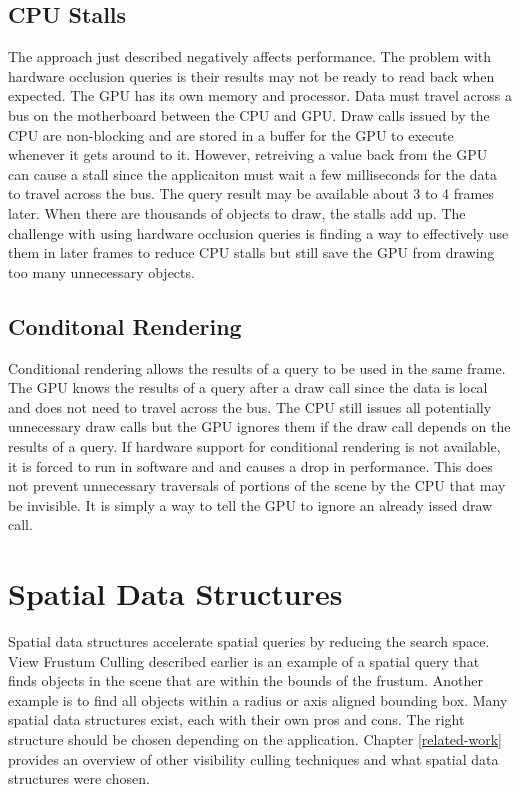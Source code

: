 \documentclass[12pt]{ucthesis}
\begin{document}
\subsection{CPU Stalls}
\label{cpu-stalls}

The approach just described negatively affects performance.
The problem with hardware occlusion queries is their results may not be ready to read back when expected.\cite{GpuGem-Occlusion, GpuGem-Queries, CHC, CHCpp}
The GPU has its own memory and processor.
Data must travel across a bus on the motherboard between the CPU and GPU.
Draw calls issued by the CPU are non-blocking and are stored in a buffer for the GPU to execute whenever it gets around to it.
However, retreiving a value back from the GPU can cause a stall since the applicaiton must wait a few milliseconds for the data to travel across the bus.
The query result may be available about 3 to 4 frames later.
When there are thousands of objects to draw, the stalls add up.
The challenge with using hardware occlusion queries is finding a way to effectively use them in later frames to reduce CPU stalls but still save the GPU from drawing too many unnecessary objects.

\subsection{Conditonal Rendering}
\label{conditional-rendering}

Conditional rendering allows the results of a query to be used in the same frame.
The GPU knows the results of a query after a draw call since the data is local and does not need to travel across the bus.
The CPU still issues all potentially unnecessary draw calls but the GPU ignores them if the draw call depends on the results of a query.
If hardware support for conditional rendering is not available, it is forced to run in software and and causes a drop in performance.
This does not prevent unnecessary traversals of portions of the scene by the CPU that may be invisible.
It is simply a way to tell the GPU to ignore an already issed draw call.

\section{Spatial Data Structures}
\label{spatial-data-structures}

Spatial data structures accelerate spatial queries by reducing the search space.
View Frustum Culling described earlier is an example of a spatial query that finds objects in the scene that are within the bounds of the frustum.
Another example is to find all objects within a radius or axis aligned bounding box.
Many spatial data structures exist, each with their own pros and cons.
The right structure should be chosen depending on the application.
Chapter \ref{related-work} provides an overview of other visibility culling techniques and what spatial data structures were chosen.
\end{document}
